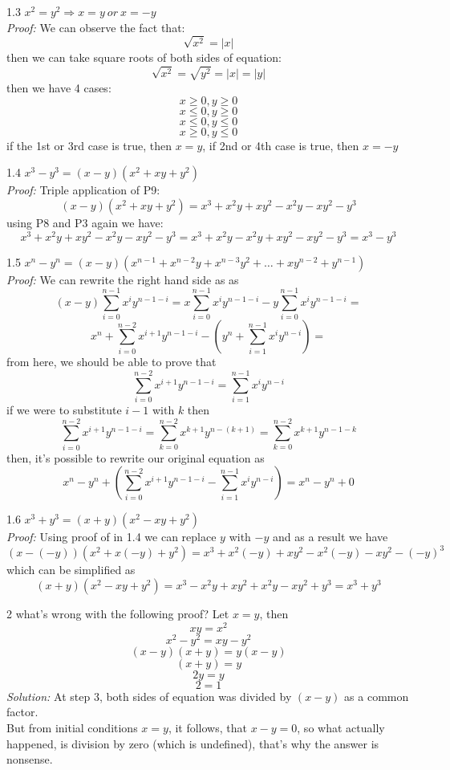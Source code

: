 \documentclass[a4paper, 11pt]{article}
\begin{document}
\hrulefill

1.3 $x^2 = y^2 \Rightarrow x = y \ or \ x = -y$\\
\emph{Proof:}
We can observe the fact that:
$$\sqrt{x^2} = |x|$$
then we can take square roots of both sides of equation:
$$\sqrt{x^2} = \sqrt{y^2} = |x| = |y|$$
then we have 4 cases:
$$x \geq 0, y \geq 0$$
$$x \leq 0, y \geq 0$$
$$x \leq 0, y \leq 0$$
$$x \geq 0, y \leq 0$$
if the 1st or 3rd case is true, then $x = y$, if 2nd or 4th case is true, then $x = - y$ 

\hrulefill

1.4 $x^3 - y^3 = (x - y)(x^2 + xy + y^2)$\\
\emph{Proof:}
Triple application of P9:
$$(x - y)(x^2 + xy + y^2) = x^3 + x^2y + xy^2 - x^2y - xy^2 - y^3$$
using P8 and P3 again we have:
$$x^3 + x^2y + xy^2 - x^2y - xy^2 - y^3 = x^3 + x^2y - x^2y + xy^2 - xy^2 - y^3 = x^3 - y^3$$ 

\hrulefill

1.5 $x^n - y^n = (x - y)(x^{n-1} + x^{n-2}y + x^{n-3}y^2 + \ldots + xy^{n-2} + y^{n-1})$\\
\emph{Proof:} 
We can rewrite the right hand side as as
$$(x - y) \sum_{i=0}^{n-1}x^iy^{n-1-i} = x\sum_{i=0}^{n-1}x^iy^{n-1-i} - y\sum_{i=0}^{n-1}x^iy^{n-1-i} = $$
$$x^n + \sum_{i=0}^{n-2}x^{i+1}y^{n-1-i} - (y^n + \sum_{i=1}^{n-1}x^iy^{n-i}) = $$
from here, we should be able to prove that
$$\sum_{i=0}^{n-2}x^{i+1}y^{n-1-i} = \sum_{i=1}^{n-1}x^iy^{n-i}$$
if we were to substitute $i - 1$ with $k$ then
$$\sum_{i=0}^{n-2}x^{i+1}y^{n-1-i} = \sum_{k=0}^{n-2}x^{k+1}y^{n-(k+1)} = \sum_{k=0}^{n-2}x^{k+1}y^{n-1-k}$$
then, it's possible to rewrite our original equation as
$$x^n - y^n + (\sum_{i=0}^{n-2}x^{i+1}y^{n-1-i} - \sum_{i=1}^{n-1}x^iy^{n-i} ) = x^n - y^n + 0$$

\hrulefill

1.6 $x^3 + y^3 = (x + y)(x^2 - xy + y^2)$\\
\emph{Proof:} 
Using proof of in 1.4 we can replace $y$ with $-y$ and as a result we have
$$(x - (-y))(x^2 + x(-y) + y^2) = x^3 + x^2(-y) + xy^2 - x^2(-y) - xy^2 - (-y)^3$$
which can be simplified as
$$(x + y)(x^2 - xy + y^2) = x^3 - x^2y + xy^2 + x^2y - xy^2 + y^3 = x^3 + y^3$$

\hrulefill

2 what's wrong with the following proof? Let $x = y$, then
$$xy = x^2$$
$$x^2 - y^2 = xy - y^2$$
$$(x - y)(x + y) = y(x - y)$$
$$(x + y) = y$$
$$2y = y$$
$$2 = 1$$
\emph{Solution:}
At step 3, both sides of equation was divided by $(x - y)$ as a common factor.\\
But from initial conditions $x = y$, it follows, that $x - y = 0$, so what
actually happened, is division by zero (which is undefined), that's why the answer is nonsense.
\end{document}
